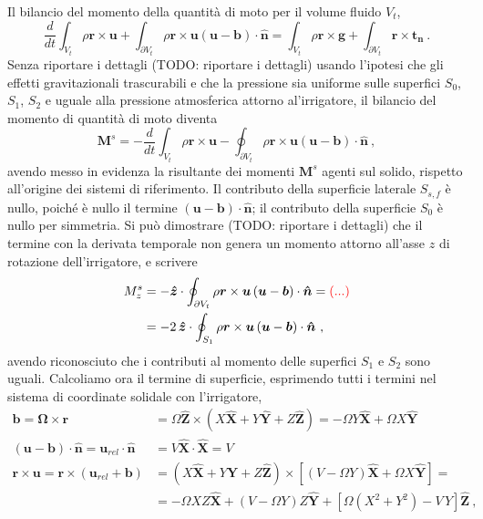 Il bilancio del momento della quantità di moto per il volume fluido $V_t$,
\begin{equation}
 \dfrac{d}{dt} \int_{V_t} \rho \bm{r} \times \bm{u} +
 \int_{\partial V_t} \rho \bm{r} \times \bm{u} \left( \bm{u} - \bm{b} \right) \cdot \bm{\hat{n}} =
 \int_{V_t} \rho \bm{r} \times \bm{g} + \int_{\partial V_t} \bm{r} \times \bm{t_n} \ .
\end{equation}
Senza riportare i dettagli {\color{red} (TODO: riportare i dettagli)} usando l'ipotesi che gli effetti gravitazionali trascurabili e che la pressione sia uniforme sulle superfici $S_0$, $S_1$, $S_2$ e uguale alla pressione atmosferica attorno al'irrigatore, il bilancio del momento di quantità di moto diventa
\begin{equation}
 \bm{M}^s = - \dfrac{d}{dt} \int_{V_t} \rho \bm{r} \times \bm{u} - \oint_{\partial V_t} \rho \bm{r} \times \bm{u} \left( \bm{u} - \bm{b} \right) \cdot \bm{\hat{n}} \ , 
\end{equation}
avendo messo in evidenza la risultante dei momenti $\bm{M}^s$ agenti sul solido, rispetto all'origine dei sistemi di riferimento. Il contributo della superficie laterale $S_{s,f}$ è nullo, poiché è nullo il termine $(\bm{u}-\bm{b}) \cdot \bm{\hat{n}}$; il contributo della superficie $S_0$ è nullo per simmetria. Si può dimostrare {\color{red} (TODO: riportare i dettagli)} che il termine con la derivata temporale non genera un momento attorno all'asse $z$ di rotazione dell'irrigatore, e scrivere
\begin{equation}
\begin{aligned}
  M^s_z & = - \bm{\hat{z}} \cdot \oint_{\partial V_t} \rho \bm{r} \times \bm{u} \left( \bm{u} - \bm{b} \right) \cdot \bm{\hat{n}} = {\color{red} (...)} \\
   & = - 2 \, \bm{\hat{z}} \cdot \oint_{S_1} \rho \bm{r} \times \bm{u} \left( \bm{u} - \bm{b} \right) \cdot \bm{\hat{n}} \ ,
\end{aligned}
\end{equation}
avendo riconosciuto che i contributi al momento delle superfici $S_1$ e $S_2$ sono uguali. Calcoliamo ora il termine di superficie, esprimendo tutti i termini nel sistema di coordinate solidale con l'irrigatore,
\begin{equation}
\begin{aligned}
 \bm{b} = \bm{\Omega} \times \bm{r} & = \Omega \bm{\hat{Z}} \times \left( X \bm{\hat{X}} + Y \bm{\hat{Y}} + Z \bm{\hat{Z}}  \right) = -\Omega Y \bm{\hat{X}} + \Omega X \bm{\hat{Y}} \\
 \left( \bm{u} - \bm{b} \right) \cdot \bm{\hat{n}} = \bm{u}_{rel} \cdot \bm{\hat{n}} & =  V \bm{\hat{X}} \cdot \bm{\hat{X}} = V \\
 \bm{r} \times \bm{u} = \bm{r} \times (\bm{u}_{rel} + \bm{b} ) & = \left( X \bm{\hat{X}} + Y \bm{\hat{Y}} + Z \bm{\hat{Z}} \right) \times \left[ \left(V-\Omega Y\right)\bm{\hat{X}} + \Omega X \bm{\hat{Y}} \right] = \\
  & = - \Omega X Z \bm{\hat{X}} + \left( V - \Omega Y \right) Z \bm{\hat{Y}} + 
  \left[ \Omega \left( X^2 + Y^2 \right) - V \, Y \right] \bm{\hat{Z}} \ , 
\end{aligned}
\end{equation}
